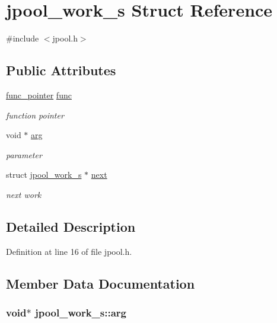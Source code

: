 \hypertarget{structjpool__work__s}{\section{jpool\-\_\-work\-\_\-s Struct Reference}
\label{structjpool__work__s}
}


{\ttfamily \#include $<$jpool.\-h$>$}

\subsection*{Public Attributes}
\begin{DoxyCompactItemize}
\item 
\hyperlink{jpool_8h_a7bc066fc6575720b392e900b1333b9c8}{func\-\_\-pointer} \hyperlink{structjpool__work__s_ab4b175d459e42b292a6b5c30fd00a64a}{func}
\begin{DoxyCompactList}\small\item\em function pointer \end{DoxyCompactList}\item 
void $\ast$ \hyperlink{structjpool__work__s_a206f422002e9e7ada814ba45f5202799}{arg}
\begin{DoxyCompactList}\small\item\em parameter \end{DoxyCompactList}\item 
struct \hyperlink{structjpool__work__s}{jpool\-\_\-work\-\_\-s} $\ast$ \hyperlink{structjpool__work__s_a50c19091ea18636394875603e5e2e494}{next}
\begin{DoxyCompactList}\small\item\em next work \end{DoxyCompactList}\end{DoxyCompactItemize}


\subsection{Detailed Description}


Definition at line 16 of file jpool.\-h.



\subsection{Member Data Documentation}
\hypertarget{structjpool__work__s_a206f422002e9e7ada814ba45f5202799}{
\subsubsection[{arg}]{\setlength{\rightskip}{0pt plus 5cm}void$\ast$ jpool\-\_\-work\-\_\-s\-::arg}}\label{structjpool__work__s_a206f422002e9e7ada814ba45f5202799}


